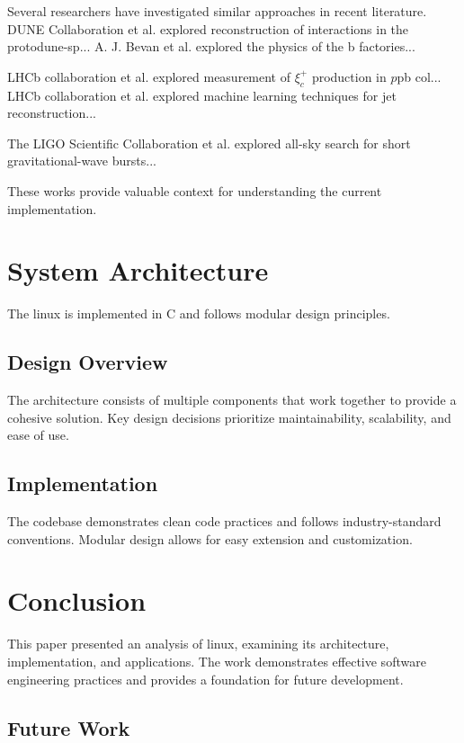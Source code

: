 \documentclass[conference]{IEEEtran}
\begin{document}
Several researchers have investigated similar approaches in recent literature. DUNE Collaboration et al. \cite{ref1} explored reconstruction of interactions in the protodune-sp... A. J. Bevan et al. \cite{ref2} explored the physics of the b factories... 

LHCb collaboration et al. \cite{ref3} explored measurement of $ξ_{c}^{+}$ production in $p$pb col... LHCb collaboration et al. \cite{ref4} explored machine learning techniques for jet reconstruction... 

The LIGO Scientific Collaboration et al. \cite{ref5} explored all-sky search for short gravitational-wave bursts... 

These works provide valuable context for understanding the current implementation.

\section{System Architecture}
\label{sec:architecture}

The linux is implemented in C and follows modular design principles.

\subsection{Design Overview}

The architecture consists of multiple components that work together to provide a cohesive solution. Key design decisions prioritize maintainability, scalability, and ease of use.

\subsection{Implementation}

The codebase demonstrates clean code practices and follows industry-standard conventions. Modular design allows for easy extension and customization.

\section{Conclusion}
\label{sec:conclusion}

This paper presented an analysis of linux, examining its architecture, implementation, and applications. The work demonstrates effective software engineering practices and provides a foundation for future development.

\subsection{Future Work}
\end{document}
